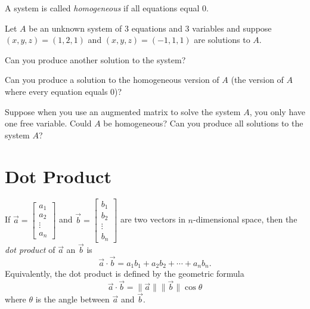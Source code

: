\documentclass[14pt]{problemset}
\begin{document}
	\question
	\begin{definition}[Homogeneous]
		A system is called \emph{homogeneous} if all equations equal $0$.
	\end{definition}

		Let $A$ be an unknown system of $3$ equations and $3$ variables and suppose
		 $(x,y,z)=(1,2,1)$ and
		$(x,y,z)=(-1,1,1)$ are solutions to $A$.
	\begin{parts}
		\item Can you produce another solution
		to the system?

		\item  Can you
		produce a solution to the homogeneous version of $A$ (the version of $A$ where every
		equation equals 0)?

		\item Suppose when you use an augmented matrix to solve the system $A$, you only have 
		one free variable.  Could $A$ be homogeneous?  Can you produce all solutions to the system $A$?
	\end{parts}

\newpage
\section*{Dot Product}

	\begin{definition}
	If $\vec a=\begin{bmatrix}a_1\\ a_2\\ \vdots \\ a_n\end{bmatrix}$ and 
	$\vec b=\begin{bmatrix}b_1\\ b_2\\ \vdots \\ b_n\end{bmatrix}$ are two vectors in $n$-dimensional
		space, then the \emph{dot product} of $\vec a$ an $\vec b$ is
	\[
		\vec a\cdot\vec b = a_1b_1+a_2b_2+\cdots+a_nb_n.
	\]
	Equivalently, the dot product is defined by the geometric formula
	\[
		\vec a\cdot \vec b = \|\vec a\|\|\vec b\|\cos \theta
	\]
	where $\theta$ is the angle between $\vec a$ and $\vec b$.
	\end{definition}
	
\end{document}
